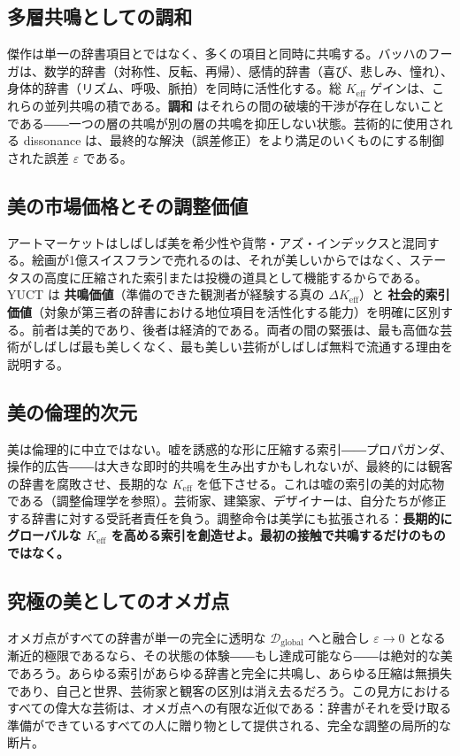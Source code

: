 \documentclass[12pt,a4paper]{article}
\newcommand{\Keff}{K_{\mathrm{eff}}}
\begin{document}
	\subsection{多層共鳴としての調和}
	
	傑作は単一の辞書項目とではなく、多くの項目と同時に共鳴する。バッハのフーガは、数学的辞書（対称性、反転、再帰）、感情的辞書（喜び、悲しみ、憧れ）、身体的辞書（リズム、呼吸、脈拍）を同時に活性化する。総 \(K_{\mathrm{eff}}\) ゲインは、これらの並列共鳴の積である。\textbf{調和} はそれらの間の破壊的干渉が存在しないことである――一つの層の共鳴が別の層の共鳴を抑圧しない状態。芸術的に使用される dissonance は、最終的な解決（誤差修正）をより満足のいくものにする制御された誤差 \(\varepsilon\) である。
	
	\subsection{美の市場価格とその調整価値}
	
	アートマーケットはしばしば美を希少性や貨幣・アズ・インデックスと混同する。絵画が1億スイスフランで売れるのは、それが美しいからではなく、ステータスの高度に圧縮された索引または投機の道具として機能するからである。YUCT は \textbf{共鳴価値}（準備のできた観測者が経験する真の \(\Delta\Keff\)）と \textbf{社会的索引価値}（対象が第三者の辞書における地位項目を活性化する能力）を明確に区別する。前者は美的であり、後者は経済的である。両者の間の緊張は、最も高価な芸術がしばしば最も美しくなく、最も美しい芸術がしばしば無料で流通する理由を説明する。
	
	\subsection{美の倫理的次元}
	
	美は倫理的に中立ではない。嘘を誘惑的な形に圧縮する索引――プロパガンダ、操作的広告――は大きな即时的共鳴を生み出すかもしれないが、最終的には観客の辞書を腐敗させ、長期的な \(K_{\mathrm{eff}}\) を低下させる。これは嘘の索引の美的対応物である（調整倫理学を参照）。芸術家、建築家、デザイナーは、自分たちが修正する辞書に対する受託者責任を負う。調整命令は美学にも拡張される：\textbf{長期的にグローバルな \(K_{\mathrm{eff}}\) を高める索引を創造せよ。最初の接触で共鳴するだけのものではなく。}
	
	\subsection{究極の美としてのオメガ点}
	
	オメガ点がすべての辞書が単一の完全に透明な \(\mathcal{D}_{\text{global}}\) へと融合し \(\varepsilon \to 0\) となる漸近的極限であるなら、その状態の体験――もし達成可能なら――は絶対的な美であろう。あらゆる索引があらゆる辞書と完全に共鳴し、あらゆる圧縮は無損失であり、自己と世界、芸術家と観客の区別は消え去るだろう。この見方におけるすべての偉大な芸術は、オメガ点への有限な近似である：辞書がそれを受け取る準備ができているすべての人に贈り物として提供される、完全な調整の局所的な断片。
	
\end{document}
